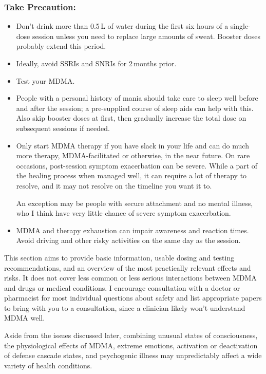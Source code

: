 \documentclass[11pt,oneside]{book}
\begin{document}
\subsubsection*{Take Precaution:}
\begin{itemize}
    \item Don't drink more than 0.5\,L of water during the first six hours of a single-dose session unless you need to replace large amounts of sweat. Booster doses probably extend this period.
    \item Ideally, avoid SSRIs and SNRIs for 2\,months prior.
    \item Test your MDMA.
    \item People with a personal history of mania should take care to sleep well before and after the session; a pre-supplied course of sleep aids can help with this. Also skip booster doses at first, then gradually increase the total dose on subsequent sessions if needed.
    \item Only start MDMA therapy if you have slack in your life and can do much more therapy, MDMA-facilitated or otherwise, in the near future. On rare occasions, post-session symptom exacerbation can be severe. While a part of the healing process when managed well, it can require a lot of therapy to resolve, and it may not resolve on the timeline you want it to.
    
    An exception may be people with secure attachment and no mental illness, who I think have very little chance of severe symptom exacerbation.
    \item MDMA and therapy exhaustion can impair awareness and reaction times. Avoid driving and other risky activities on the same day as the session.
\end{itemize}

This section aims to provide basic information, usable dosing and testing recommendations, and an overview of the most practically relevant effects and risks. It does not cover less common or less serious interactions between MDMA and drugs or medical conditions. I encourage consultation with a doctor or pharmacist for most individual questions about safety and list appropriate papers to bring with you to a consultation, since a clinician likely won't understand MDMA well.

Aside from the issues discussed later, combining unusual states of consciousness, the physiological effects of MDMA, extreme emotions, activation or deactivation of defense cascade states, and psychogenic illness may unpredictably affect a wide variety of health conditions.
\end{document}
